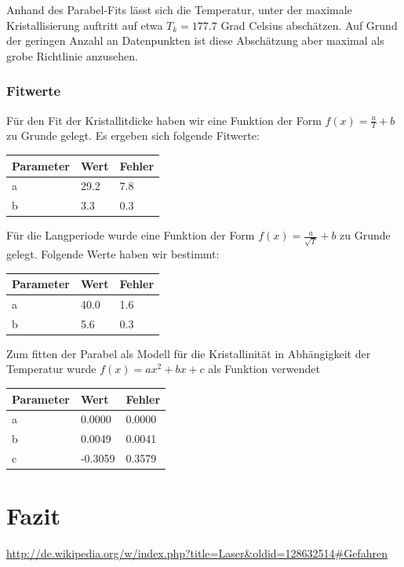 \documentclass[bigchapter,colorback,accentcolor=tud4b,linedtoc,11pt]{tudreport}
\begin{document}
Anhand des Parabel-Fits lässt sich die Temperatur, unter der maximale Kristallisierung auftritt auf etwa $T_k = 177.7$ Grad Celsius abschätzen. Auf Grund der geringen Anzahl an Datenpunkten ist diese Abschätzung aber maximal als grobe Richtlinie anzusehen.

\clearpage{}
\subsection{Fitwerte}

Für den Fit der Kristallitdicke haben wir eine Funktion der Form $f\left(x\right) = \frac{a}{T} + b$ zu Grunde gelegt. Es ergeben sich folgende Fitwerte:
\begin{center}
  \begin{tabular}{|p{1.5cm}|p{1.5cm}|p{1.5cm}|}
    \hline
    Parameter & Wert    & Fehler \\ \hline
    a         & 29.2   & 7.8   \\ \hline
    b         & 3.3    & 0.3   \\ \hline
	\end{tabular}
\end{center}

Für die Langperiode wurde eine Funktion der Form $f\left(x\right)  = \frac{a}{\sqrt{T}} + b$ zu Grunde gelegt. Folgende Werte haben wir bestimmt:
\begin{center}
  \begin{tabular}{|p{1.5cm}|p{1.5cm}|p{1.5cm}|}
    \hline
    Parameter & Wert    & Fehler \\ \hline
    a         & 40.0   & 1.6   \\ \hline
    b         & 5.6    & 0.3   \\ \hline
	\end{tabular}
\end{center}

Zum fitten der Parabel als Modell für die Kristallinität in Abhängigkeit der Temperatur wurde $f\left(x\right)  = ax^2 + bx + c$ als Funktion verwendet

\begin{center}
  \begin{tabular}{|p{1.5cm}|p{1.5cm}|p{1.5cm}|}
    \hline
    Parameter & Wert    & Fehler \\ \hline
    a         & 0.0000  & 0.0000 \\ \hline
    b         & 0.0049  & 0.0041 \\ \hline
    c         & -0.3059 & 0.3579 \\ \hline
	\end{tabular}
\end{center}

\chapter{Fazit}

\cleardoublepage{}
\newpage
\begin{thebibliography}{100}
   \url{http://de.wikipedia.org/w/index.php?title=Laser&oldid=128632514#Gefahren}
\end{thebibliography}
\end{document}
